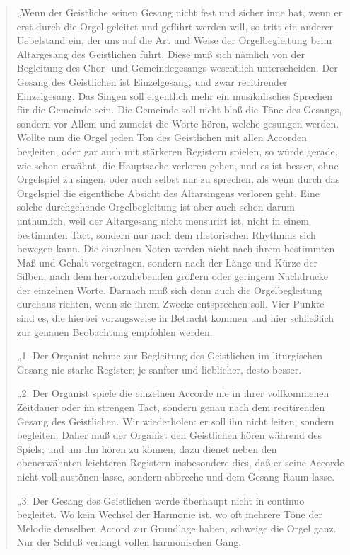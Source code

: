 \begin{quote}
„Wenn der Geistliche seinen Gesang nicht fest und sicher inne hat, wenn er erst durch die Orgel geleitet und geführt werden will, so tritt ein anderer Uebelstand ein, der uns auf die Art und Weise der Orgelbegleitung beim Altargesang des Geistlichen führt. Diese muß sich nämlich von der Begleitung des Chor- und Gemeindegesangs wesentlich unterscheiden. Der Gesang des Geistlichen ist Einzelgesang, und zwar recitirender Einzelgesang. Das Singen soll eigentlich mehr ein musikalisches Sprechen für die Gemeinde sein. Die Gemeinde soll nicht bloß die Töne des Gesangs, sondern vor Allem und zumeist die Worte hören, welche gesungen werden. Wollte nun die Orgel jeden Ton des Geistlichen mit allen Accorden begleiten, oder gar auch mit stärkeren Registern spielen, so würde gerade, wie schon erwähnt, die Hauptsache verloren gehen, und es ist besser, ohne Orgelspiel zu singen, oder auch selbst nur zu sprechen, als wenn durch das Orgelspiel die eigentliche Absicht des Altarsingens verloren geht. Eine solche durchgehende Orgelbegleitung ist aber auch schon darum unthunlich, weil der Altargesang nicht mensurirt ist, nicht in einem bestimmten Tact, sondern nur nach dem rhetorischen Rhythmus sich bewegen kann. Die einzelnen Noten werden nicht nach ihrem bestimmten Maß und Gehalt vorgetragen, sondern nach der Länge und Kürze der Silben, nach dem hervorzuhebenden größern oder geringern Nachdrucke der einzelnen Worte. Darnach muß sich denn auch die Orgelbegleitung durchaus richten, wenn sie ihrem Zwecke entsprechen soll. Vier Punkte sind es, die hierbei vorzugsweise in Betracht kommen und hier schließlich zur genauen Beobachtung empfohlen werden.

„1. Der Organist nehme zur Begleitung des Geistlichen im liturgischen Gesang nie starke Register; je sanfter und lieblicher, desto besser.

„2. Der Organist spiele die einzelnen Accorde nie in ihrer vollkommenen Zeitdauer oder im strengen Tact, sondern genau nach dem recitirenden Gesang des Geistlichen. Wir wiederholen: er soll ihn nicht leiten, sondern begleiten. Daher muß der Organist den Geistlichen hören
während des Spiels; und um ihn hören zu können, dazu dienet neben den obenerwähnten leichteren Registern insbesondere dies, daß er seine Accorde nicht voll austönen lasse, sondern abbreche und dem Gesang Raum lasse.

„3. Der Gesang des Geistlichen werde überhaupt nicht in continuo begleitet. Wo kein Wechsel der Harmonie ist, wo oft mehrere Töne der Melodie denselben Accord zur Grundlage haben, schweige die Orgel ganz. Nur der Schluß verlangt vollen harmonischen Gang.


\end{quote}
